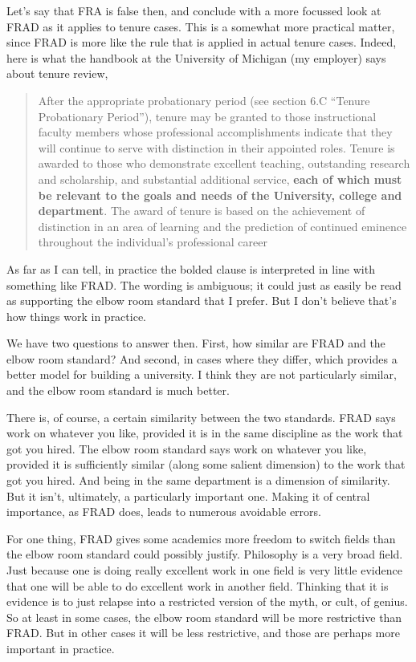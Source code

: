 Let's say that FRA is false then, and conclude with a more focussed look at FRAD as it applies to tenure cases. This is a somewhat more practical matter, since FRAD is more like the rule that is applied in actual tenure cases. Indeed, here is what the handbook at the University of Michigan (my employer) says about tenure review,

\begin{quote}

After the appropriate probationary period (see section 6.C ``Tenure Probationary Period''), tenure may be granted to those instructional faculty members whose professional accomplishments indicate that they will continue to serve with distinction in their appointed roles. Tenure is awarded to those who demonstrate excellent teaching, outstanding research and scholarship, and substantial additional service, \textbf{each of which must be relevant to the goals and needs of the University, college and department}. The award of tenure is based on the achievement of distinction in an area of learning and the prediction of continued eminence throughout the individual’s professional career ~\citep[emphasis added]{MichTenureB}
\end{quote}
As far as I can tell, in practice the bolded clause is interpreted in line with something like FRAD. The wording is ambiguous; it could just as easily be read as supporting the elbow room standard that I prefer. But I don't believe that's how things work in practice.

We have two questions to answer then. First, how similar are FRAD and the elbow room standard? And second, in cases where they differ, which provides a better model for building a university. I think they are not particularly similar, and the elbow room standard is much better.

There is, of course, a certain similarity between the two standards. FRAD says work on whatever you like, provided it is in the same discipline as the work that got you hired. The elbow room standard says work on whatever you like, provided it is sufficiently similar (along some salient dimension) to the work that got you hired. And being in the same department is a dimension of similarity. But it isn't, ultimately, a particularly important one. Making it of central importance, as FRAD does, leads to numerous avoidable errors.

For one thing, FRAD gives some academics more freedom to switch fields than the elbow room standard could possibly justify. Philosophy is a very broad field. Just because one is doing really excellent work in one field is very little evidence that one will be able to do excellent work in another field. Thinking that it is evidence is to just relapse into a restricted version of the myth, or cult, of genius. So at least in some cases, the elbow room standard will be more restrictive than FRAD. But in other cases it will be less restrictive, and those are perhaps more important in practice.

